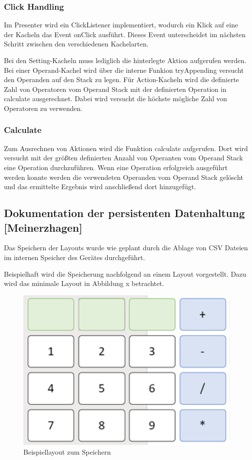 \subsubsection{Click Handling}

Im Presenter wird ein ClickListener implementiert, wodurch ein Klick auf eine der Kacheln das Event onClick ausführt. Dieses Event unterscheidet im nächsten Schritt zwischen den verschiedenen Kachelarten.

Bei den Setting-Kacheln muss lediglich die hinterlegte Aktion aufgerufen werden. Bei einer Operand-Kachel wird über die interne Funkion tryAppending versucht den Operanden auf den Stack zu legen. Für Action-Kacheln wird die definierte Zahl von Operatoren vom Operand Stack mit der definierten Operation in calculate ausgerechnet. Dabei wird versucht die höchste mögliche Zahl von Operatoren zu verwenden.

\subsubsection{Calculate}

Zum Ausrechnen von Aktionen wird die Funktion calculate aufgerufen. Dort wird versucht mit der größten definierten Anzahl von Operanten vom Operand Stack eine Operation durchzuführen. Wenn eine Operation erfolgreich ausgeführt werden konnte werden die verwendeten Operanden vom Operand Stack gelöscht und das ermittelte Ergebnis wird anschließend dort hinzugefügt.

\subsection{Dokumentation der persistenten Datenhaltung [Meinerzhagen]}
\label{subsection:dokumentation-der-persistenten-datenhaltung}

Das Speichern der Layouts wurde wie geplant durch die Ablage von CSV Dateien im internen Speicher des Gerätes durchgeführt. 

Beispielhaft wird die Speicherung nachfolgend an einem Layout vorgestellt. Dazu wird das minimale Layout in Abbildung x betrachtet.  

\begin{figure}[h]
	\includegraphics[scale=1]{img/beispiellayout-zum-speichern}
	\caption[Beispiellayout zum Speichern]{Beispiellayout zum Speichern\footnotemark}
\end{figure}

